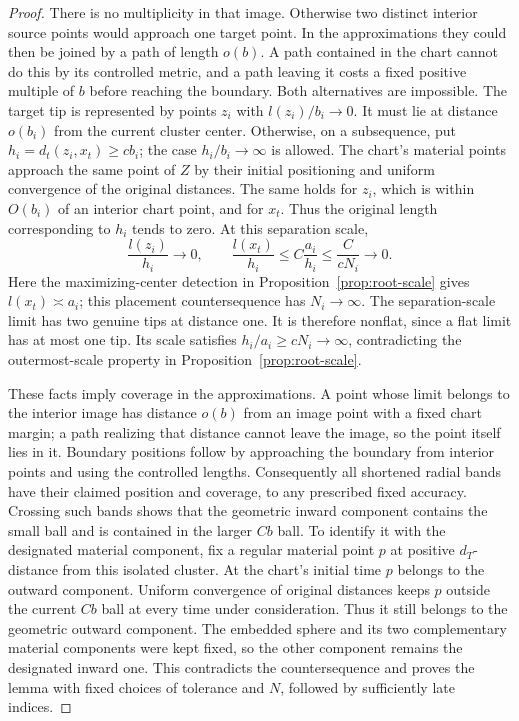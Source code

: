 \begin{proof}
There is no multiplicity in that image.  Otherwise two distinct
interior source points would approach one target point.  In the
approximations they could then be joined by a path of length $o(b)$.
A path contained in the chart cannot do this by its controlled
metric, and a path leaving it costs a fixed positive multiple of $b$
before reaching the boundary.  Both alternatives are impossible.
The target tip is represented by points $z_i$ with $l(z_i)/b_i\to0$.
It must lie at distance $o(b_i)$ from the current cluster center.
Otherwise, on a subsequence, put $h_i=d_t(z_i,x_t)\ge cb_i$; the
case $h_i/b_i\to\infty$ is allowed.  The chart's material points
approach the same point of $Z$ by their initial positioning and
uniform convergence of the original distances.  The same holds
for $z_i$, which is within $O(b_i)$ of an interior chart point,
and for $x_t$.  Thus the original length corresponding to $h_i$
tends to zero.  At this separation scale,
\[
 \frac{l(z_i)}{h_i}\longrightarrow0,\qquad
 \frac{l(x_t)}{h_i}\le C\frac{a_i}{h_i}
                    \le\frac{C}{cN_i}\longrightarrow0.
\]
Here the maximizing-center detection in
Proposition~\ref{prop:root-scale} gives $l(x_t)\asymp a_i$;
this placement countersequence has $N_i\to\infty$.
The separation-scale limit has two genuine tips at distance one.
It is therefore nonflat, since a flat limit has at most one tip.
Its scale satisfies $h_i/a_i\ge cN_i\to\infty$, contradicting
the outermost-scale property in Proposition~\ref{prop:root-scale}.

These facts imply coverage in the approximations.  A point whose
limit belongs to the interior image has distance $o(b)$ from an image
point with a fixed chart margin; a path realizing that distance
cannot leave the image, so the point itself lies in it.  Boundary
positions follow by approaching the boundary from interior points
and using the controlled lengths.  Consequently all shortened
radial bands have their claimed position and coverage, to any
prescribed fixed accuracy.  Crossing such bands shows that the
geometric inward component contains the small ball and is contained
in the larger $Cb$ ball.  To identify it with the designated material
component, fix a regular material point $p$ at positive $d_T$-distance
from this isolated cluster.  At the chart's initial time $p$ belongs
to the outward component.  Uniform convergence of original distances
keeps $p$ outside the current $Cb$ ball at every time under consideration.
Thus it still belongs to the geometric outward component.  The
embedded sphere and its two complementary material components were
kept fixed, so the other component remains the designated inward one.
This contradicts the countersequence and proves the lemma with fixed
choices of tolerance and $N$, followed by sufficiently late indices.
\end{proof}

